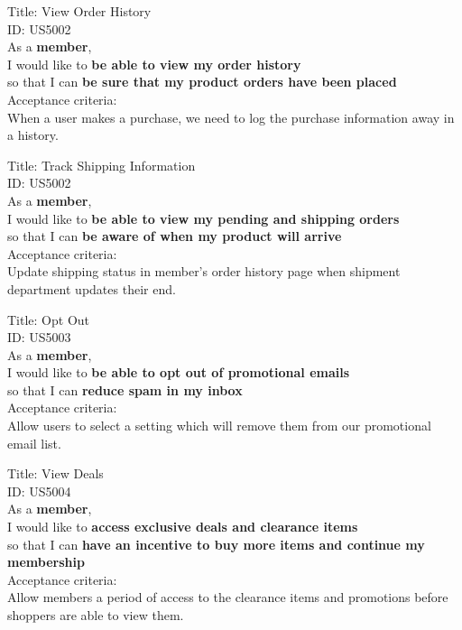 \documentclass{article}
\begin{document}
\begin{framed}
\noindent
Title:  View Order History \\
ID: US5002 \\
As a \textbf{member},\\
 \textbullet  \quad \quad I would like to \textbf{be able to view my order history }\\ 
 \textbullet  \quad \quad so that I can \textbf{be sure that my product orders have been placed}\\
 Acceptance criteria: \\
  \textbullet  \quad \quad When a user makes a purchase, we need to log the purchase information away in a history.
\end{framed}

\begin{framed}
\noindent
Title:  Track Shipping Information \\
ID: US5002 \\
As a \textbf{member},\\
 \textbullet  \quad \quad I would like to \textbf{be able to view my pending and shipping orders }\\ 
 \textbullet  \quad \quad so that I can \textbf{be aware of when my product will arrive}\\
 Acceptance criteria: \\
  \textbullet  \quad \quad Update shipping status in member's order history page when shipment department updates their end.
\end{framed}

\begin{framed}
\noindent
Title:  Opt Out \\
ID: US5003 \\
As a \textbf{member},\\
\textbullet  \quad \quad I would like to \textbf{be able to opt out of promotional emails}\\ 
\textbullet  \quad \quad so that I can \textbf{reduce spam in my inbox}\\
Acceptance criteria: \\
\textbullet  \quad \quad Allow users to select a setting which will remove them from our promotional email list.
\end{framed}


\begin{framed}
\noindent
Title:  View Deals \\
ID: US5004 \\
As a \textbf{member},\\
\textbullet  \quad \quad I would like to \textbf{access exclusive deals and clearance items}\\ 
\textbullet  \quad \quad so that I can \textbf{have an incentive to buy more items and continue my membership}\\
Acceptance criteria: \\
\textbullet  \quad \quad Allow members a period of access to the clearance items and promotions before shoppers are able to view them.
\end{framed}
\end{document}
